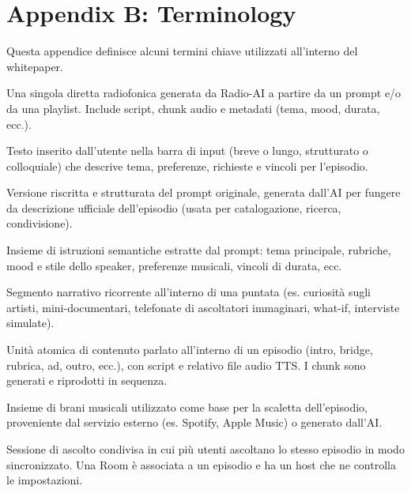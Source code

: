 \documentclass[11pt,a4paper]{article}
\begin{document}
\section{Appendix B: Terminology}
\label{appendix:terminology}

Questa appendice definisce alcuni termini chiave utilizzati all’interno del whitepaper.

\begin{description}[leftmargin=!,labelwidth=3cm]
    \item[Episodio / Episode] Una singola diretta radiofonica generata da Radio-AI a partire da un prompt e/o da una playlist. Include script, chunk audio e metadati (tema, mood, durata, ecc.).
    
    \item[Prompt] Testo inserito dall’utente nella barra di input (breve o lungo, strutturato o colloquiale) che descrive tema, preferenze, richieste e vincoli per l’episodio.
    
    \item[Prompt Normalizzato] Versione riscritta e strutturata del prompt originale, generata dall’AI per fungere da descrizione ufficiale dell’episodio (usata per catalogazione, ricerca, condivisione).
    
    \item[Intent] Insieme di istruzioni semantiche estratte dal prompt: tema principale, rubriche, mood e stile dello speaker, preferenze musicali, vincoli di durata, ecc.
    
    \item[Rubrica] Segmento narrativo ricorrente all’interno di una puntata (es. curiosità sugli artisti, mini-documentari, telefonate di ascoltatori immaginari, what-if, interviste simulate).
    
    \item[Chunk] Unità atomica di contenuto parlato all’interno di un episodio (intro, bridge, rubrica, ad, outro, ecc.), con script e relativo file audio TTS. I chunk sono generati e riprodotti in sequenza.
    
    \item[Playlist] Insieme di brani musicali utilizzato come base per la scaletta dell’episodio, proveniente dal servizio esterno (es. Spotify, Apple Music) o generato dall’AI.
    
    \item[Room / Radio Room] Sessione di ascolto condivisa in cui più utenti ascoltano lo stesso episodio in modo sincronizzato. Una Room è associata a un episodio e ha un host che ne controlla le impostazioni.
    

\end{description}
\end{document}
